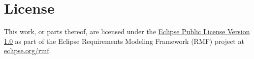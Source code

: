 % 

\section{License}
\label{sec:license}

This work, or parts thereof, are licensed under the \href{https://www.eclipse.org/legal/epl-v10.html}{Eclipse Public License Version 1.0} as part of the Eclipse Requirements Modeling Framework (RMF) project at \href{https://www.eclipse.org/rmf}{eclipse.org/rmf}.


